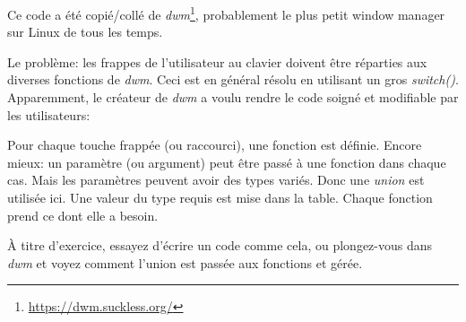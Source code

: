 
Ce code a été copié/collé de \emph{dwm}\footnote{\url{https://dwm.suckless.org/}},
probablement le plus petit window manager sur Linux de tous les temps.

Le problème: les frappes de l'utilisateur au clavier doivent être réparties aux diverses
fonctions de \emph{dwm}.
Ceci est en général résolu en utilisant un gros \emph{switch()}.
Apparemment, le créateur de \emph{dwm} a voulu rendre le code soigné et modifiable
par les utilisateurs:



Pour chaque touche frappée (ou raccourci), une fonction est définie.
Encore mieux: un paramètre (ou argument) peut être passé à une fonction dans chaque
cas.
Mais les paramètres peuvent avoir des types variés.
Donc une \emph{union} est utilisée ici.
Une valeur du type requis est mise dans la table.
Chaque fonction prend ce dont elle a besoin.

À titre d'exercice, essayez d'écrire un code comme cela, ou plongez-vous dans \emph{dwm}
et voyez comment l'union est passée aux fonctions et gérée.

